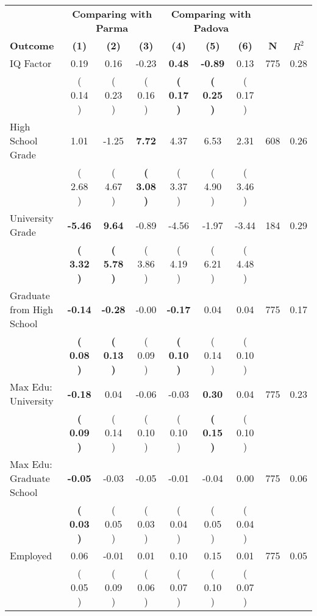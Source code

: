 \begin{tabular}{lcccccccc}
\toprule
 & \multicolumn{3}{c}{\textbf{Comparing with Parma}} & \multicolumn{3}{c}{\textbf{Comparing with Padova}} & \\
\cmidrule(lr){2-4} \cmidrule(lr){5-7} 
 \textbf{Outcome} & \textbf{(1)} & \textbf{(2)} & \textbf{(3)} & \textbf{(4)} & \textbf{(5)} & \textbf{(6)} & \textbf{N} & \textbf{$ R^2$} \\
\midrule
IQ Factor &      0.19 &      0.16 &     -0.23 & \textbf{     0.48} & \textbf{    -0.89} &      0.13 & 775 &       0.28 \\ 
 & (     0.14 ) & (     0.23 ) & (     0.16 ) & \textbf{(     0.17 )} & \textbf{(     0.25 )} & (     0.17 ) & \\
High School Grade &      1.01 &     -1.25 & \textbf{     7.72} &      4.37 &      6.53 &      2.31 & 608 &       0.26 \\ 
 & (     2.68 ) & (     4.67 ) & \textbf{(     3.08 )} & (     3.37 ) & (     4.90 ) & (     3.46 ) & \\
University Grade & \textbf{    -5.46} & \textbf{     9.64} &     -0.89 &     -4.56 &     -1.97 &     -3.44 & 184 &       0.29 \\ 
 & \textbf{(     3.32 )} & \textbf{(     5.78 )} & (     3.86 ) & (     4.19 ) & (     6.21 ) & (     4.48 ) & \\
Graduate from High School & \textbf{    -0.14} & \textbf{    -0.28} &     -0.00 & \textbf{    -0.17} &      0.04 &      0.04 & 775 &       0.17 \\ 
 & \textbf{(     0.08 )} & \textbf{(     0.13 )} & (     0.09 ) & \textbf{(     0.10 )} & (     0.14 ) & (     0.10 ) & \\
Max Edu: University & \textbf{    -0.18} &      0.04 &     -0.06 &     -0.03 & \textbf{     0.30} &      0.04 & 775 &       0.23 \\ 
 & \textbf{(     0.09 )} & (     0.14 ) & (     0.10 ) & (     0.10 ) & \textbf{(     0.15 )} & (     0.10 ) & \\
Max Edu: Graduate School & \textbf{    -0.05} &     -0.03 &     -0.05 &     -0.01 &     -0.04 &      0.00 & 775 &       0.06 \\ 
 & \textbf{(     0.03 )} & (     0.05 ) & (     0.03 ) & (     0.04 ) & (     0.05 ) & (     0.04 ) & \\
Employed &      0.06 &     -0.01 &      0.01 &      0.10 &      0.15 &      0.01 & 775 &       0.05 \\ 
 & (     0.05 ) & (     0.09 ) & (     0.06 ) & (     0.07 ) & (     0.10 ) & (     0.07 ) & \\

\end{tabular}
